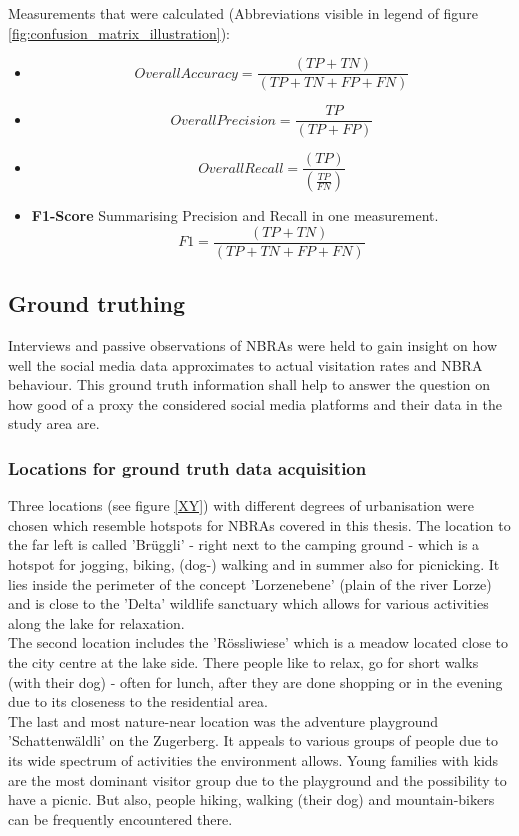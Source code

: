 Measurements that were calculated (Abbreviations visible in legend of figure \ref{fig:confusion_matrix_illustration}):
\begin{itemize}
    \item \[Overall Accuracy = \frac{(TP+TN)}{(TP+TN+FP+FN)}\]
    \item \[Overall Precision = \frac{TP}{(TP+FP)}\]
    \item \[Overall Recall = \frac{(TP)}{(\frac{TP}{FN})}\]
    \item \textbf{F1-Score} Summarising Precision and Recall in one measurement.\\ 
    \[F1 = \frac{(TP+TN)}{(TP+TN+FP+FN)}\]
\end{itemize}

\subsection{Ground truthing} \label{groud_truthing}
Interviews and passive observations of NBRAs were held to gain insight on how well the social media data approximates to actual visitation rates and NBRA behaviour. This ground truth information shall help to answer the question on how good of a proxy the considered social media platforms and their data in the study area are.
\subsubsection{Locations for ground truth data acquisition} \label{locations_ground_truthing_data}
Three locations (see figure \ref{XY}) with different degrees of urbanisation were chosen which resemble hotspots for NBRAs covered in this thesis. The location to the far left is called 'Br\"uggli' - right next to the camping ground - which is a hotspot for jogging, biking, (dog-) walking and in summer also for picnicking. It lies inside the perimeter of the concept 'Lorzenebene' (plain of the river Lorze) and is close to the 'Delta' wildlife sanctuary which allows for various activities along the lake for relaxation.\\
The second location includes the 'R\"ossliwiese' which is a meadow located close to the city centre at the lake side. There people like to relax, go for short walks (with their dog) - often for lunch, after they are done shopping or in the evening due to its closeness to the residential area.\\
The last and most nature-near location was the adventure playground 'Schattenw\"aldli' on the Zugerberg. It appeals to various groups of people due to its wide spectrum of activities the environment allows. Young families with kids are the most dominant visitor group due to the playground and the possibility to have a picnic. But also, people hiking, walking (their dog) and mountain-bikers can be frequently encountered there.

